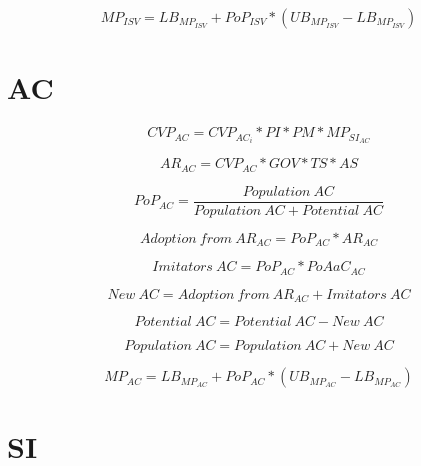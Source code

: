 \begin{equation}
	MP_{ISV} = LB_{MP_{ISV}} + PoP_{ISV} * (UB_{MP_{ISV}} - LB_{MP_{ISV}})
\end{equation}

\newpage
\section{AC}

\begin{equation}
		CVP_{AC} =  CVP_{AC_{i}} * PI * PM * MP_{SI_{AC}}
\end{equation}

\begin{equation}
		AR_{AC} = CVP_{AC} * GOV * TS * AS		
\end{equation}

\begin{equation}
	PoP_{AC} = \frac{\mathit{Population~AC}}{\mathit{Population~AC}+\mathit{Potential~AC}}
\end{equation}

\begin{equation}
	\mathit{Adoption~from~AR_{AC}} = PoP_{AC} * AR_{AC}
\end{equation}

\begin{equation}
	\mathit{Imitators~AC} = PoP_{AC} * PoAaC_{AC}
\end{equation}

\begin{equation}
	\mathit{New~AC} = \mathit{Adoption~from~AR_{AC}} + \mathit{Imitators~AC}
\end{equation}

\begin{equation}
	\mathit{Potential~AC} = \mathit{Potential~AC} - \mathit{New~AC}
\end{equation}

\begin{equation}
	\mathit{Population~AC} = \mathit{Population~AC} + \mathit{New~AC}
\end{equation}

\begin{equation}
	MP_{AC} = LB_{MP_{AC}} + PoP_{AC} * (UB_{MP_{AC}} - LB_{MP_{AC}})
\end{equation}

\newpage
\section{SI}

